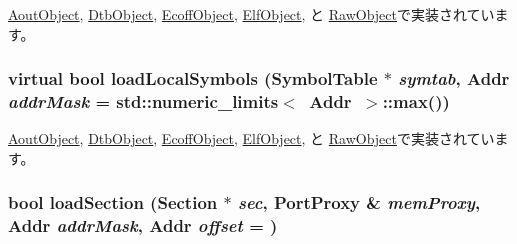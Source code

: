 \hyperlink{classAoutObject_a1de102f86bbb53d20455d9e78be53935}{AoutObject}, \hyperlink{classDtbObject_a1de102f86bbb53d20455d9e78be53935}{DtbObject}, \hyperlink{classEcoffObject_a1de102f86bbb53d20455d9e78be53935}{EcoffObject}, \hyperlink{classElfObject_a1de102f86bbb53d20455d9e78be53935}{ElfObject}, と \hyperlink{classRawObject_a1de102f86bbb53d20455d9e78be53935}{RawObject}で実装されています。\hypertarget{classObjectFile_a15e7fbacc339ac9a4d50e4aa36591339}{
\subsubsection[{loadLocalSymbols}]{\setlength{\rightskip}{0pt plus 5cm}virtual bool loadLocalSymbols ({\bf SymbolTable} $\ast$ {\em symtab}, \/  {\bf Addr} {\em addrMask} = {\ttfamily std::numeric\_\-limits$<$~{\bf Addr}~$>$::max()})}}
\label{classObjectFile_a15e7fbacc339ac9a4d50e4aa36591339}


\hyperlink{classAoutObject_aab9393b89c15838ac1b842e642f981bb}{AoutObject}, \hyperlink{classDtbObject_aab9393b89c15838ac1b842e642f981bb}{DtbObject}, \hyperlink{classEcoffObject_aab9393b89c15838ac1b842e642f981bb}{EcoffObject}, \hyperlink{classElfObject_aab9393b89c15838ac1b842e642f981bb}{ElfObject}, と \hyperlink{classRawObject_aab9393b89c15838ac1b842e642f981bb}{RawObject}で実装されています。\hypertarget{classObjectFile_aa7e7fd749b6ba3ce19c7d5a3032d890c}{
\subsubsection[{loadSection}]{\setlength{\rightskip}{0pt plus 5cm}bool loadSection ({\bf Section} $\ast$ {\em sec}, \/  {\bf PortProxy} \& {\em memProxy}, \/  {\bf Addr} {\em addrMask}, \/  {\bf Addr} {\em offset} = {})}}
\label{classObjectFile_aa7e7fd749b6ba3ce19c7d5a3032d890c}



